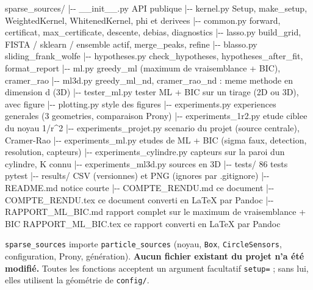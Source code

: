 \documentclass[
  french,
]{article}
\newenvironment{Shaded}{}{}
\newcommand{\NormalTok}[1]{#1}
\begin{document}
\begin{Shaded}
\begin{Highlighting}[]
\NormalTok{sparse\_sources/}
\NormalTok{|{-}{-} \_\_init\_\_.py             API publique}
\NormalTok{|{-}{-} kernel.py               Setup, make\_setup, WeightedKernel, WhitenedKernel, phi et derivees}
\NormalTok{|{-}{-} common.py               forward, certificat, max\_certificate, descente, debias, diagnostics}
\NormalTok{|{-}{-} lasso.py                build\_grid, FISTA / sklearn / ensemble actif, merge\_peaks, refine}
\NormalTok{|{-}{-} blasso.py               sliding\_frank\_wolfe}
\NormalTok{|{-}{-} hypotheses.py           check\_hypotheses, hypotheses\_after\_fit, format\_report}
\NormalTok{|{-}{-} ml.py                   greedy\_ml (maximum de vraisemblance + BIC), cramer\_rao}
\NormalTok{|{-}{-} ml3d.py                 greedy\_ml\_nd, cramer\_rao\_nd : meme methode en dimension d (3D)}
\NormalTok{|{-}{-} tester\_ml.py            tester ML + BIC sur un tirage (2D ou 3D), avec figure}
\NormalTok{|{-}{-} plotting.py             style des figures}
\NormalTok{|{-}{-} experiments.py          experiences generales (3 geometries, comparaison Prony)}
\NormalTok{|{-}{-} experiments\_1r2.py      etude ciblee du noyau 1/r\^{}2}
\NormalTok{|{-}{-} experiments\_projet.py   scenario du projet (source centrale), Cramer{-}Rao}
\NormalTok{|{-}{-} experiments\_ml.py       etudes de ML + BIC (sigma faux, detection, resolution, capteurs)}
\NormalTok{|{-}{-} experiments\_cylindre.py capteurs sur la paroi d\textquotesingle{}un cylindre, K connu}
\NormalTok{|{-}{-} experiments\_ml3d.py     sources en 3D}
\NormalTok{|{-}{-} tests/                  86 tests pytest}
\NormalTok{|{-}{-} results/                CSV (versionnes) et PNG (ignores par .gitignore)}
\NormalTok{|{-}{-} README.md               notice courte}
\NormalTok{|{-}{-} COMPTE\_RENDU.md         ce document}
\NormalTok{|{-}{-} COMPTE\_RENDU.tex        ce document converti en LaTeX par Pandoc}
\NormalTok{|{-}{-} RAPPORT\_ML\_BIC.md       rapport complet sur le maximum de vraisemblance + BIC}
\NormalTok{\textasciigrave{}{-}{-} RAPPORT\_ML\_BIC.tex      ce rapport converti en LaTeX par Pandoc}
\end{Highlighting}
\end{Shaded}

\texttt{sparse\_sources} importe \texttt{particle\_sources} (noyau,
\texttt{Box}, \texttt{CircleSensors}, configuration, Prony, génération).
\textbf{Aucun fichier existant du projet n'a été modifié.} Toutes les
fonctions acceptent un argument facultatif \texttt{setup=} ; sans lui,
elles utilisent la géométrie de \texttt{config/}.
\end{document}
